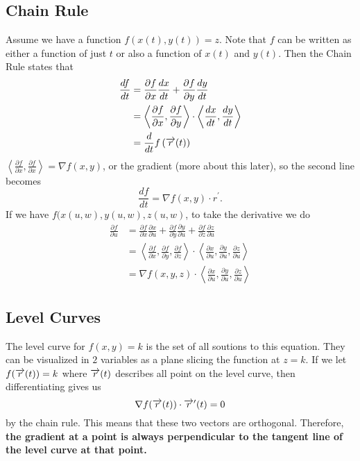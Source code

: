 \documentclass[12pt]{article}
\theoremstyle{plain} %
\theoremstyle{definition}
\theoremstyle{definition}
\theoremstyle{definition}
\theoremstyle{remark}
\newcommand{\vecr}{\vv{r}}
\newcommand{\angled}[1]{\left\langle {#1} \right\rangle}
\newcommand*{\vv}[1]{\overrightarrow{\mkern0mu#1}}
\newcommand{\ddt}{\frac{d}{dt}}
\begin{document}
\subsection{Chain Rule}
Assume we have a function $f(x(t),y(t)) = z.$ Note that $f$ can be written as either a function of just $t$ or also a function of $x(t)$ and $y(t)$.
Then the Chain Rule states that
\begin{align*}
\frac{df}{dt} & = \frac{\partial f}{\partial x} \frac{dx}{dt} + \frac{\partial f}{\partial y} \frac{dy}{dt}  \\
&= \angled{\frac{\partial f}{\partial x},\frac{\partial f}{\partial y}} \cdot \angled{\frac{dx}{dt},\frac{dy}{dt}} \\
& = \ddt f\left(\vecr(t)\right)
\end{align*}
$\angled{\frac{\partial f}{\partial x}, \frac{\partial f}{\partial x}} = \nabla f(x,y)$, or the gradient (more about this later), so the second line becomes
\[ \frac{df}{dt} = \nabla f(x,y) \cdot r^\prime. \]
If we have $f(x(u,w),y(u,w),z(u,w)$, to take the derivative we do
\begin{align*}
    \frac{\partial f}{\partial u} & =
    \frac{\partial f}{\partial x} \frac{\partial x}{\partial u} +
    \frac{\partial f}{\partial y} \frac{\partial y}{\partial u} +
    \frac{\partial f}{\partial z} \frac{\partial z}{\partial u} \\
    & = \angled{
    \frac{\partial f}{\partial x},
    \frac{\partial f}{\partial y},
    \frac{\partial f}{\partial z}} \cdot
    \angled{
    \frac{\partial x}{\partial u},
    \frac{\partial y}{\partial u},
    \frac{\partial z}{\partial u}} \\
    & = \nabla f(x,y,z) \cdot
    \angled{
    \frac{\partial x}{\partial u},
    \frac{\partial y}{\partial u},
    \frac{\partial z}{\partial u}}
\end{align*}

\subsection{Level Curves}
The level curve for $f(x,y)=k$ is the set of all soutions to this equation.
They can be visualized in $2$ variables as a plane slicing the function at $z=k$.
If we let $f(\vecr(t))=k$ where $\vecr(t)$ describes all point on the level curve, then differentiating gives us
\[ \nabla f(\vecr(t)) \cdot \vecr^\prime(t) = 0 \]
by the chain rule. This means that these two vectors are orthogonal. Therefore, \textbf{the gradient at a point is always perpendicular to the tangent line of the level curve at that point.}
\end{document}
